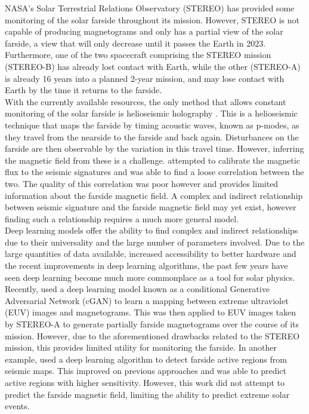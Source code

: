 \documentclass[11pt,a4paper,onecolumn]{report}
\begin{document}
NASA's Solar Terrestrial Relations Observatory (STEREO) has provided some
monitoring of the solar farside throughout its mission. However, STEREO is not
capable of producing magnetograms and only has a partial view of the solar
farside, a view that will only decrease until it passes the Earth in 2023.
Furthermore, one of the two spacecraft comprising the STEREO mission (STEREO-B)
has already lost contact with Earth, while the other (STEREO-A) is already 16
years into a planned 2-year mission, and may lose contact with Earth by the time
it returns to the farside. \\



With the currently available resources, the only method that allows constant
monitoring of the solar farside is helioseismic holography
\citep{lindsey_seismic_2000}. This is a helioseismic technique that maps the
farside by timing acoustic waves, known as p-modes, as they travel from the
nearside to the farside and back again. Disturbances on the farside are then
observable by the variation in this travel time. However, inferring the magnetic
field from these is a challenge. \citet{Gonzalez_Hernandez_2007} attempted to
calibrate the magnetic flux to the seismic signatures and was able to find a
loose correlation between the two. The quality of this correlation was poor
however and provides limited information about the farside magnetic field. A
complex and indirect relationship between seismic signature and the farside
magnetic field may yet exist, however finding such a relationship requires a
much more general model.\\


Deep learning models offer the ability to find complex and indirect
relationships due to their universality and the large number of parameters
involved. Due to the large quantities of data available, increased accessibility
to better hardware and the recent improvements in deep learning algorithms, the
past few years have seen deep learning become much more commonplace as a tool
for solar physics. Recently, \citet{Kim2019} used a deep learning model known
as a conditional Generative Adversarial Network (cGAN) to learn a mapping
between extreme ultraviolet (EUV) images and magnetograms. This was then applied
to EUV images taken by STEREO-A to generate partially farside magnetograms over
the course of its mission. However, due to the aforementioned drawbacks related
to the STEREO mission, this provides limited utility for monitoring the farside.
In another example, \citet{felipe_improved_2019} used a deep learning algorithm
to detect farside active regions from seismic maps. This improved on previous
approaches and was able to predict active regions with higher sensitivity.
However, this work did not attempt to predict the farside magnetic field,
limiting the ability to predict extreme solar events. \\
\end{document}
